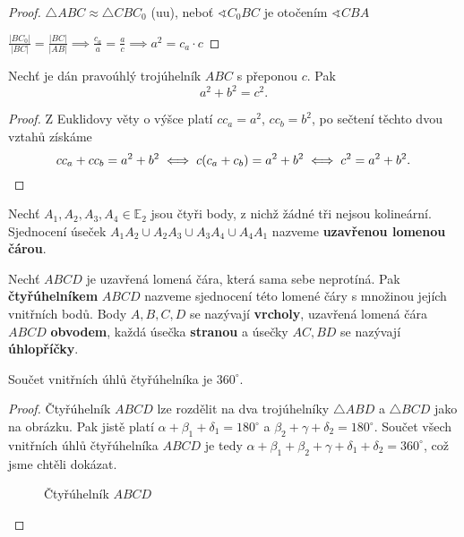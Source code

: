\begin{proof}
  $\triangle ABC \approx \triangle CBC_0$ (uu), neboť $\sphericalangle C_0 BC$ je otočením $\sphericalangle CBA$

  $\frac{|BC_0|}{|BC|} = \frac{|BC|}{|AB|} \implies \frac{c_a}{a} = \frac{a}{c} \implies a^2 = c_a \cdot c$
\end{proof}

\begin{veta}[Pythagorova]
  Nechť je dán pravoúhlý trojúhelník $ABC$ s přeponou $c$. Pak
  \[
    a^2+b^2 = c^2.
  \]
\end{veta}


\begin{proof}
  Z Euklidovy věty o výšce platí $cc_a=a^2$, $cc_b=b^2$, po sečtení těchto dvou vztahů získáme
  \[
    cc_a+cc_b=a^2+b^2 \iff c(c_a+c_b)=a^2+b^2 \iff c^2=a^2+b^2. \qedhere
  \]
\end{proof}

\begin{definition}
  Nechť $A_1,A_2, A_3, A_4 \in \mathbb E_2$ jsou čtyři body, z nichž žádné tři nejsou kolineární. Sjednocení úseček $A_1A_2\cup A_2A_3 \cup A_3A_4 \cup A_4A_1$ nazveme \textbf{uzavřenou lomenou čárou}.
\end{definition}

\begin{definition}
  Nechť $ABCD$ je uzavřená lomená čára, která sama sebe neprotíná. Pak \textbf{čtyřúhelníkem} $ABCD$ nazveme sjednocení této lomené čáry s množinou jejích vnitřních bodů. Body $A,B,C,D$ se nazývají \textbf{vrcholy}, uzavřená lomená čára $ABCD$ \textbf{obvodem}, každá úsečka \textbf{stranou} a úsečky $AC,BD$ se nazývají \textbf{úhlopříčky}.
\end{definition}

\begin{veta}
  Součet vnitřních úhlů čtyřúhelníka je $360^\circ$.
\end{veta}

\begin{proof}
  Čtyřúhelník $ABCD$ lze rozdělit na dva trojúhelníky
  $\triangle ABD $ a $\triangle BCD$ jako na obrázku.
  Pak jistě platí $\alpha + \beta_1 + \delta_1 = 180^\circ$ a
  $\beta_2 + \gamma + \delta_2 = 180^\circ$. Součet všech vnitřních úhlů
  čtyřúhelníka $ABCD$ je tedy $\alpha + \beta_1 + \beta_2 + \gamma + \delta_1
  + \delta_2 = 360^\circ$, což jsme chtěli dokázat.
  \begin{figure}[ht!]
    \centering
    \caption{Čtyřúhelník $ABCD$}
  \end{figure}
\end{proof}

